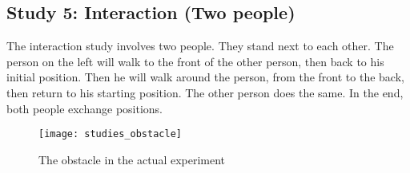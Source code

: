 \subsection{Study 5: Interaction (Two people)}

The interaction study involves two people. They stand next to each other. The person on the left will walk to the front of the other person, then back to his initial position. Then he will walk around the person, from the front to the back, then return to his starting position. The other person does the same. In the end, both people exchange positions.

\begin{figure}[h!]
  \centering
  \texttt{[image: studies\_obstacle]}
  \caption{The obstacle in the actual experiment}
  \label{fig:studies_obstacle}
\end{figure}
